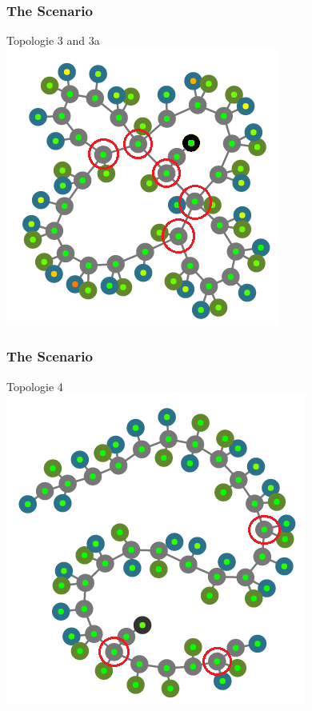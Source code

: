 \documentclass{beamer}
\begin{document}
\begin{frame}
	\frametitle{The Scenario}
	\centering
	Topologie 3 and 3a \\
	\includegraphics[height=0.8\textheight]{pics/topo_4_4a.png}
\end{frame}

\begin{frame}
	\frametitle{The Scenario}
	\centering
	Topologie 4 \\
	\includegraphics[height=0.8\textheight]{pics/topo_5.png}
\end{frame}
\end{document}
